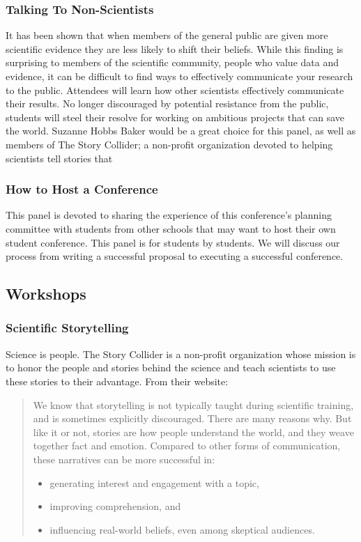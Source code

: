 \subsubsection{Talking To Non-Scientists}
It has been shown that when members of the general public are given more scientific evidence they are less likely to shift their beliefs. While this finding is surprising to members of the scientific community, people who value data and evidence, it can be difficult to find ways to effectively communicate your research to the public. Attendees will learn how other scientists effectively communicate their results. No longer discouraged by potential resistance from the public, students will steel their resolve for working on ambitious projects that can save the world. Suzanne Hobbs Baker would be a great choice for this panel, as well as members of The Story Collider; a non-profit organization devoted to helping scientists tell stories that 

\subsubsection{How to Host a Conference}
This panel is devoted to sharing the experience of this conference's planning committee with students from other schools that may want to host their own student conference. This panel is for students by students. We will discuss our process from writing a successful proposal to executing a successful conference. 


\subsection{Workshops}

\subsubsection{Scientific Storytelling}
Science is people. The Story Collider is a non-profit organization whose mission is to honor the people and stories behind the science and teach scientists to use these stories to their advantage. From their website:
\begin{quote}
	We know that storytelling is not typically taught during scientific training, and is sometimes explicitly discouraged. There are many reasons why. But like it or not, stories are how people understand the world, and they weave together fact and emotion. Compared to other forms of communication, these narratives can be more successful in:
	\begin{itemize}
		\item generating interest and engagement with a topic,
		\item improving comprehension, and
		\item influencing real-world beliefs, even among skeptical audiences.
	\end{itemize}
\end{quote}

